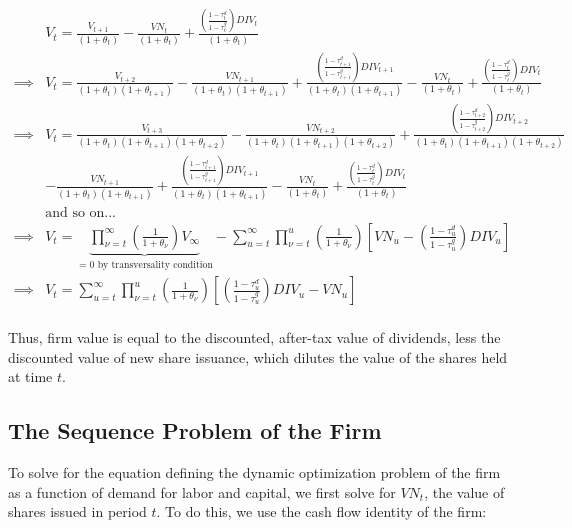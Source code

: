 \begin{equation}
\label{eqn:solve_vs}
\begin{split}
& V_{t}=\frac{V_{t+1}}{(1+\theta_{t})} - \frac{VN_{t}}{(1+\theta_{t})}  + \frac{\left(\frac{1-\tau^{d}_{t}}{1-\tau^{g}_{t}}\right)DIV_{t}}{(1+\theta_{t})} \\
\implies &  V_{t}=\frac{V_{t+2}}{(1+\theta_{t})(1+\theta_{t+1})} - \frac{VN_{t+1}}{(1+\theta_{t})(1+\theta_{t+1})}  + \frac{\left(\frac{1-\tau^{d}_{t+1}}{1-\tau^{g}_{t+1}}\right)DIV_{t+1}}{(1+\theta_{t})(1+\theta_{t+1})} - \frac{VN_{t}}{(1+\theta_{t})}  + \frac{\left(\frac{1-\tau^{d}_{t}}{1-\tau^{g}_{t}}\right)DIV_{t}}{(1+\theta_{t})} \\
\implies &  V_{t}= \frac{V_{t+3}}{(1+\theta_{t})(1+\theta_{t+1})(1+\theta_{t+2})} - \frac{VN_{t+2}}{(1+\theta_{t})(1+\theta_{t+1})(1+\theta_{t+2})}  + \frac{\left(\frac{1-\tau^{d}_{t+2}}{1-\tau^{g}_{t+2}}\right)DIV_{t+2}}{(1+\theta_{t})(1+\theta_{t+1})(1+\theta_{t+2})} \\
& - \frac{VN_{t+1}}{(1+\theta_{t})(1+\theta_{t+1})}  + \frac{\left(\frac{1-\tau^{d}_{t+1}}{1-\tau^{g}_{t+1}}\right)DIV_{t+1}}{(1+\theta_{t})(1+\theta_{t+1})} - \frac{VN_{t}}{(1+\theta_{t})}  + \frac{\left(\frac{1-\tau^{d}_{t}}{1-\tau^{g}_{t}}\right)DIV_{t}}{(1+\theta_{t})} \\
& \text{and so on...} \\
\implies & V_{t}=\underbrace{\prod_{\nu=t}^{\infty}\left(\frac{1}{1+\theta_{\nu}}\right)V_{\infty}}_{=0 \text{ by transversality condition}} - \sum_{u=t}^{\infty} \prod_{\nu=t}^{u}\left(\frac{1}{1+\theta_{\nu}}\right)\left[VN_{u} - \left(\frac{1-\tau^{d}_{u}}{1-\tau^{g}_{u}}\right)DIV_{u}\right]\\
\implies & V_{t}= \sum_{u=t}^{\infty} \prod_{\nu=t}^{u}\left(\frac{1}{1+\theta_{\nu}}\right)\left[ \left(\frac{1-\tau^{d}_{u}}{1-\tau^{g}_{u}}\right)DIV_{u}-VN_{u}\right]\\
\end{split}
\end{equation}

Thus, firm value is equal to the discounted, after-tax value of dividends, less the discounted value of new share issuance, which dilutes the value of the shares held at time $t$. 

\subsection{The Sequence Problem of the Firm}

To solve for the equation defining the dynamic optimization problem of the firm as a function of demand for labor and capital, we first solve for $VN_{t}$, the value of shares issued in period $t$.  To do this, we use the cash flow identity of the firm: 

